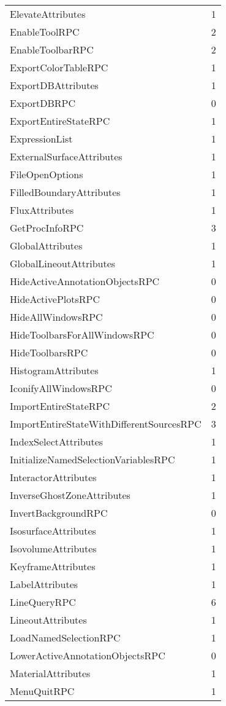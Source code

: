 \documentclass[10pt,a4paper]{report}
\begin{document}
\begin{longtable}{ll}
ElevateAttributes & 1 \\
EnableToolRPC & 2 \\
EnableToolbarRPC & 2 \\
ExportColorTableRPC & 1 \\
ExportDBAttributes & 1 \\
ExportDBRPC & 0 \\
ExportEntireStateRPC & 1 \\
ExpressionList & 1 \\
ExternalSurfaceAttributes & 1 \\
FileOpenOptions & 1 \\
FilledBoundaryAttributes & 1 \\
FluxAttributes & 1 \\
GetProcInfoRPC & 3 \\
GlobalAttributes & 1 \\
GlobalLineoutAttributes & 1 \\
HideActiveAnnotationObjectsRPC & 0 \\
HideActivePlotsRPC & 0 \\
HideAllWindowsRPC & 0 \\
HideToolbarsForAllWindowsRPC & 0 \\
HideToolbarsRPC & 0 \\
HistogramAttributes & 1 \\
IconifyAllWindowsRPC & 0 \\
ImportEntireStateRPC & 2 \\
ImportEntireStateWithDifferentSourcesRPC & 3 \\
IndexSelectAttributes & 1 \\
InitializeNamedSelectionVariablesRPC & 1 \\
InteractorAttributes & 1 \\
InverseGhostZoneAttributes & 1 \\
InvertBackgroundRPC & 0 \\
IsosurfaceAttributes & 1 \\
IsovolumeAttributes & 1 \\
KeyframeAttributes & 1 \\
LabelAttributes & 1 \\
LineQueryRPC & 6 \\
LineoutAttributes & 1 \\
LoadNamedSelectionRPC & 1 \\
LowerActiveAnnotationObjectsRPC & 0 \\
MaterialAttributes & 1 \\
MenuQuitRPC & 1 \\

\end{longtable}
\end{document}
